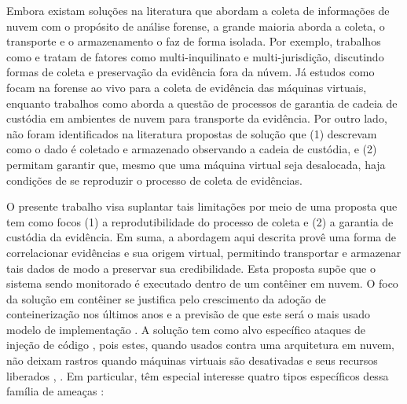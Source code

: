\documentclass[conference]{IEEEtran}
\newcommand{\marcos}[1]{{\color{blue}{MARCOS: #1}}}
\begin{document}
%
Embora existam soluções na literatura que abordam a coleta de informações de nuvem com o propósito de análise forense, a grande maioria aborda a coleta, o transporte e o armazenamento o faz de forma isolada.
%
Por exemplo, trabalhos como \cite{Dykstra_FROST:2013} e \cite{Reichert_Auto_acquisition:2015} tratam de fatores como multi-inquilinato e multi-jurisdição, discutindo formas de coleta e preservação da evidência fora da núvem.
%
Já estudos como \cite{George_DF2CE:2012} focam na forense ao vivo para a coleta de evidência das máquinas virtuais, enquanto trabalhos como \cite{Sang_Log_approach:2013} aborda a questão de processos de garantia de cadeia de custódia em ambientes de nuvem para transporte da evidência.
%
%
%
Por outro lado, não foram identificados na literatura propostas de solução que (1) descrevam como o dado é coletado e armazenado observando a cadeia de custódia, e (2) permitam garantir que, mesmo que uma máquina virtual seja desalocada, haja condições de se reproduzir o processo de coleta de evidências.



%
O presente trabalho visa suplantar tais limitações por meio de uma proposta que tem como focos (1) a reprodutibilidade do processo de coleta e (2) a garantia de custódia da evidência.
%
Em suma, a abordagem aqui descrita provê uma forma de correlacionar evidências e sua origem virtual, permitindo transportar e armazenar tais dados de modo a preservar sua credibilidade.
%
Esta proposta supõe que o sistema sendo monitorado é executado dentro de um contêiner em nuvem. O foco da solução em contêiner se justifica pelo crescimento da adoção de conteinerização nos últimos anos e a previsão de que este será o mais usado modelo de implementação \cite{Piraghaj_Container_Cloud_Computing:2016}.
A solução tem como alvo específico ataques de injeção de código \cite{Case_Memory_Forensics:2014}, pois estes, quando usados contra uma arquitetura em nuvem, não deixam rastros quando máquinas virtuais são desativadas e seus recursos liberados \cite{Vomel_Memory_Acquisition:2013}, \cite{Case_Memory_Forensics:2014}.
%
Em particular, têm especial interesse quatro tipos específicos dessa família de ameaças \cite{Case_Memory_Forensics:2014}:
\end{document}
